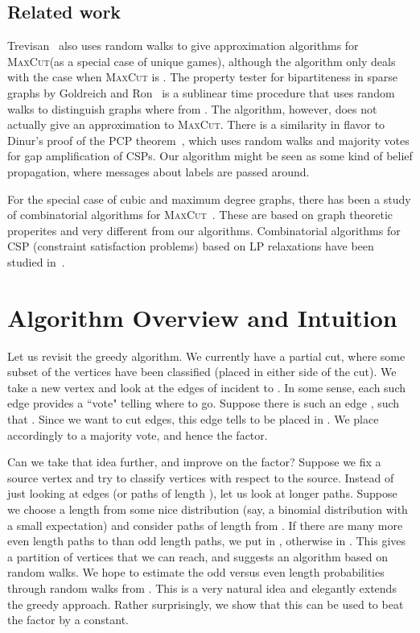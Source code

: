 \documentclass[11pt]{article}
\def\maxcut{\textsc{MaxCut}\xspace}
\begin{document}
\subsection{Related work}

Trevisan~\cite{Tre05} also uses random walks to give approximation algorithms for \maxcut (as a special case of unique games), although the algorithm only deals with the case when \maxcut is .
The property tester for bipartiteness in sparse graphs
by Goldreich and Ron~\cite{GR99} is a sublinear time procedure that uses
random walks to distinguish
graphs where  from .
The algorithm, however, does not actually give an approximation to \maxcut.
There is a similarity in flavor to Dinur's proof of the PCP theorem~\cite{Din05},
which uses
random walks and majority votes for gap amplification of CSPs.
Our algorithm might be seen as some kind of belief
propagation, where messages about labels are passed around.

For the special case of cubic and maximum
degree  graphs, there has been a study of combinatorial
algorithms for \maxcut~\cite{BL86,ELZ04,BT08}. These
are based on graph theoretic properites and very different
from our algorithms. Combinatorial algorithms for CSP
(constraint satisfaction problems) based on LP
relaxations have been studied in~\cite{DDFGMP03}.



\section{Algorithm Overview and Intuition}

Let us revisit the greedy algorithm. We currently have a partial
cut, where some subset  of the vertices have been classified (placed
in either side of the cut). We take a new vertex  and look at the
edges of  incident to . In some sense, each such edge provides
a ``vote" telling  where to go.
Suppose there is such an edge , such that .
Since we want to cut edges, this edge tells  to be placed in .
We place  accordingly to a majority vote, and hence the  factor.

Can we take that idea further, and improve on the  factor?
Suppose we fix a source vertex  and
try to classify vertices with respect to the source.
Instead of just looking at edges (or paths of length ),
let us look at longer paths. Suppose we choose a length
 from some nice distribution (say, a binomial
distribution with a small expectation)
and consider paths of length  from .
If there are many more even length paths to  than odd length
paths, we put  in , otherwise in .
This gives a partition of vertices that we can reach,
and suggests an algorithm based on random walks.
We hope to estimate the odd versus even length probabilities
through random walks from . This is a very natural
idea and elegantly extends the greedy approach. Rather
surprisingly, we show that this can be used to beat
the  factor by a constant.
\end{document}
